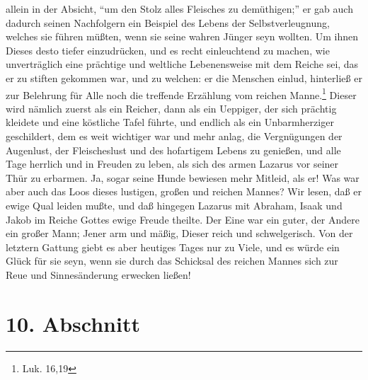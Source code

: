 allein in der Absicht, "`um den Stolz alles Fleisches zu demüthigen;"' er gab
auch dadurch seinen Nachfolgern ein Beispiel des Lebens der Selbstverleugnung,
welches sie führen müßten, wenn sie seine wahren Jünger seyn wollten. Um ihnen
Dieses desto tiefer einzudrücken, und es recht einleuchtend zu machen, wie
unverträglich eine prächtige und weltliche Lebenensweise mit dem Reiche sei, das
er zu stiften gekommen war, und zu welchen: er die Menschen einlud, hinterließ
er zur Belehrung für Alle noch die treffende Erzählung vom reichen
Manne.\footnote{Luk. 16,19} Dieser wird nämlich zuerst als ein Reicher, dann als
ein Ueppiger, der sich prächtig kleidete und eine köstliche Tafel führte, und
endlich als ein Unbarmherziger geschildert, dem es weit wichtiger war und mehr
anlag, die Vergnügungen der Augenlust, der Fleischeslust und des hofartigem
Lebens zu genießen, und alle Tage herrlich und in Freuden zu leben, als sich des
armen Lazarus vor seiner Thür zu erbarmen. Ja, sogar seine Hunde bewiesen mehr
Mitleid, als er! Was war aber auch das Loos dieses lustigen, großen und reichen
Mannes? Wir lesen, daß er ewige Qual leiden mußte, und daß hingegen Lazarus mit
Abraham, Isaak und Jakob im Reiche Gottes ewige Freude theilte. Der Eine war ein
guter, der Andere ein großer Mann; Jener arm und mäßig, Dieser reich und
schwelgerisch. Von der letztern Gattung giebt es aber heutiges Tages nur zu
Viele, und es würde ein Glück für sie seyn, wenn sie durch das Schicksal des
reichen Mannes sich zur Reue und Sinnesänderung erwecken ließen!

\section{10. Abschnitt}

